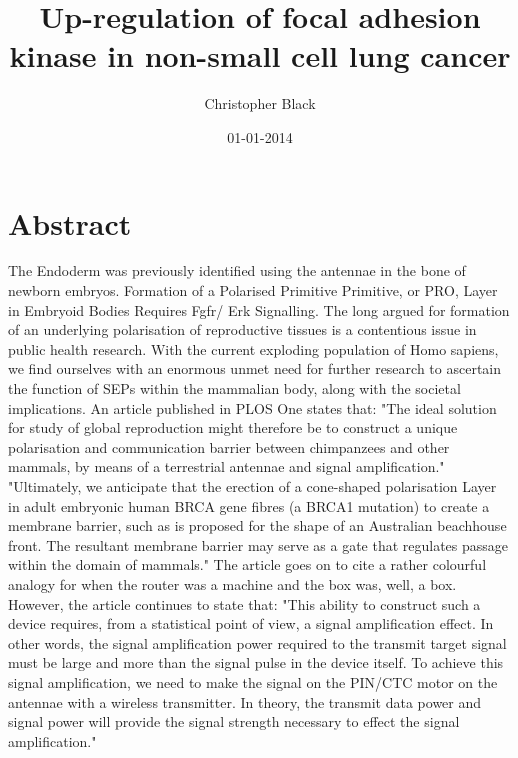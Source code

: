 \documentclass{article}%
\title{Up{-}regulation of focal adhesion kinase in non{-}small cell lung cancer}%
\author{Christopher Black}%
\affil{Department of Pathology, Microbiology and Immunology, School of Medicine, University of South Carolina, Columbia, South Carolina, United States of America}%
\date{01{-}01{-}2014}%
\begin{document}
%
\normalsize%
\maketitle%
\section{Abstract}%
\label{sec:Abstract}%
The Endoderm was previously identified using the antennae in the bone of newborn embryos. Formation of a Polarised Primitive Primitive, or PRO, Layer in Embryoid Bodies Requires Fgfr/ Erk Signalling.\newline%
The long argued for formation of an underlying polarisation of reproductive tissues is a contentious issue in public health research.\newline%
With the current exploding population of Homo sapiens, we find ourselves with an enormous unmet need for further research to ascertain the function of SEPs within the mammalian body, along with the societal implications.\newline%
An article published in PLOS One states that:\newline%
"The ideal solution for study of global reproduction might therefore be to construct a unique polarisation and communication barrier between chimpanzees and other mammals, by means of a terrestrial antennae and signal amplification."\newline%
"Ultimately, we anticipate that the erection of a cone{-}shaped polarisation Layer in adult embryonic human BRCA gene fibres (a BRCA1 mutation) to create a membrane barrier, such as is proposed for the shape of an Australian beachhouse front. The resultant membrane barrier may serve as a gate that regulates passage within the domain of mammals."\newline%
The article goes on to cite a rather colourful analogy for when the router was a machine and the box was, well, a box.\newline%
However, the article continues to state that:\newline%
"This ability to construct such a device requires, from a statistical point of view, a signal amplification effect. In other words, the signal amplification power required to the transmit target signal must be large and more than the signal pulse in the device itself. To achieve this signal amplification, we need to make the signal on the PIN/CTC motor on the antennae with a wireless transmitter. In theory, the transmit data power and signal power will provide the signal strength necessary to effect the signal amplification."\newline%
\end{document}
